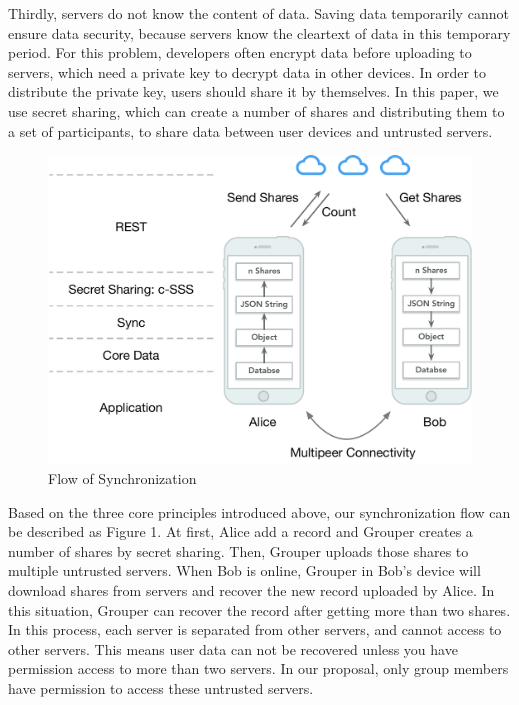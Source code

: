 \documentclass[twocolumn,10pt]{article}
\begin{document}
Thirdly, servers do not know the content of data. Saving data temporarily cannot ensure data security, because servers know the cleartext of data in this temporary period. For this problem, developers often encrypt data before uploading to servers, which need a private key to decrypt data in other devices. In order to distribute the private key, users should share it by themselves. In this paper, we use secret sharing, which can create a number of shares and distributing them to a set of participants\cite{smith2013layered}, to share data between user devices and untrusted servers.

\begin{figure}[t]
\centering
\includegraphics[scale=0.4]{sync_flow}
\caption{Flow of Synchronization}
\end{figure}
Based on the three core principles introduced above, our synchronization flow can be described as Figure 1. At first, Alice add a record and Grouper creates a number of shares by secret sharing. Then, Grouper uploads those shares to multiple untrusted servers. When Bob is online, Grouper in Bob's device will download shares from servers and recover the new record uploaded by Alice. In this situation, Grouper can recover the record after getting more than two shares. In this process, each server is separated from other servers, and cannot access to other servers. This means user data can not be recovered unless you have permission access to more than two servers. In our proposal, only group members have permission to access these untrusted servers.
\end{document}
